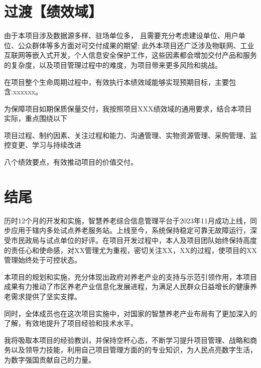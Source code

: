 \documentclass[UTF8]{../computerUniverse}
\begin{document}
\section{过渡【绩效域】}


由于本项目涉及数据源多样、驻场单位多，
且需要充分考虑建设单位、用户单位、公众群体等多方面对可交付成果的期望;
此外本项目还广泛涉及物联网、工业互联网等嵌入式开发，个人信息安全保护工作，这些因素都会增加交付产品和服务的复杂度，以及项目管理过程中的难度，为项目带来更多风险和挑战。


在项目整个生命周期过程中，有效执行本绩效域能够实现预期目标，主要包含:xxxxxx。

为保障项目如期保质保量交付，我按照项目XXX绩效域的通用要求，结合本项目实际，重点围绕以下

项目过程、制约因素、关注过程和能力、沟通管理、实物资源管理、采购管理、监控变更、学习与持续改进

八个绩效要点，有效推动项目的价值交付。



\section{结尾}

历时12个月的开发和实施，智慧养老综合信息管理平台于2023年11月成功上线，同步应用于辖内多处试点养老服务站。上线至今，系统保持稳定可靠无故障运行，深受市民政局与试点单位的好评。在项目开发过程中，本人及项目团队始终保持高度的责任心和使命感，对XX管理尤为重视，密切关注XX，XX的过程，使项目的XX管理始终处于可控状态。

本项目的规划和实施，充分体现出政府对养老产业的支持与示范引领作用，本项目成果有力推动了市区养老产业信息化发展进程，为满足人民群众日益增长的健康养老需求提供了坚实支撑。

同时，全体成员也在这次项目实施中，对国家的智慧养老产业布局有了更加深入的了解，有效地提升了项目经验和技术水平。


我将吸取本项目的经验教训，并保持空杯心态，不断学习提升项目管理、战略和商务以及领导力技能，利用自己项目管理方面的的专业知识，为人民点亮数字生活，为数字强国贡献自己的力量。


\end{document}
